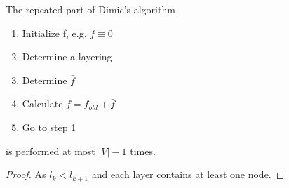 \begin{corollary}
The repeated part of Dimic's algorithm 
\begin{enumerate}
\item Initialize f, e.g. $f \equiv 0$
\item Determine a layering
\item Determine $\bar{f}$
\item Calculate $f = f_{old} + \bar{f}$
\item Go to step 1
\end{enumerate}
is performed at most $|V| -1$ times.
\end{corollary}

\begin{proof}
As $l_k < l_{k+1}$ and each layer contains at least one node.
\end{proof}